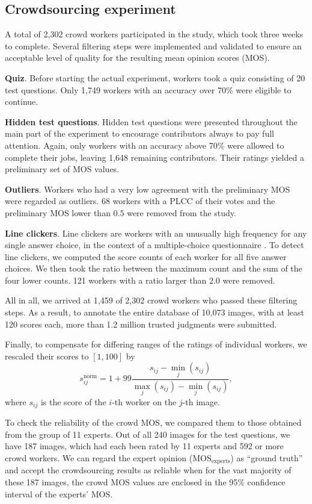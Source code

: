 \documentclass[10pt,journal,compsoc]{IEEEtran}
\begin{document}
\subsection{Crowdsourcing experiment}

A total of 2,302 crowd workers participated in the study, which took three weeks to complete.  Several filtering steps were implemented and validated to ensure an acceptable level of quality for the resulting mean opinion scores (MOS).

{\smallskip \noindent \textbf{Quiz}.} Before starting the actual experiment, workers took a quiz consisting of 20 test questions. Only 1,749 workers with an accuracy over 70\% were eligible to continue.  

{\smallskip \noindent \textbf{Hidden test questions}.} Hidden test questions were presented throughout the main part of the experiment to encourage contributors always to pay full attention. Again, only workers with an accuracy above 70\% were allowed to complete their jobs, leaving 1,648 remaining contributors. Their ratings yielded a preliminary set of MOS values. 

{\smallskip \noindent \textbf{Outliers}.} Workers who had a very low agreement with the preliminary MOS were regarded as outliers. 68 workers with a PLCC of their votes and the preliminary MOS lower than $0.5$ were removed from the study.

{\smallskip \noindent \textbf{Line clickers}.} Line clickers are workers with an unusually high frequency for any single answer choice, in the context of a multiple-choice questionnaire \cite{QoMEXReliability}. To detect line clickers, we computed the score counts of each worker for all five answer choices. We then took the ratio between the maximum count and the sum of the four lower counts. 121 workers with a ratio larger than $2.0$ were removed.

\smallskip
All in all, we arrived at 1,459 of 2,302 crowd workers who passed these filtering steps. As a result, to annotate the entire database of 10,073 images, with at least 120 scores each, more than 1.2 million trusted judgments were submitted. 

Finally, to compensate for differing ranges of the ratings of individual workers, we rescaled their scores to $[1,100]$ by
$$
s_{ij}^{\text{norm}} = 1 + 99 \frac {s_{ij} - \min_j (s_{ij})}{\max_j (s_{ij}) - \min_j (s_{ij})},
$$
where $s_{ij}$ is the score of the $i$-th worker on the $j$-th image. 

To check the reliability of the crowd MOS, we compared them to those obtained from the group of 11 experts. Out of all 240 images for the test questions, we have 187 images, which had each been rated by 11 experts and 592 or more crowd workers. We can regard the expert opinion ($\text{MOS}_\text{experts}$) as ``ground truth'' and accept the crowdsourcing results as reliable when for the vast majority of these 187 images, the crowd MOS values are enclosed in the 95\% confidence interval of the experts' MOS.
\end{document}
